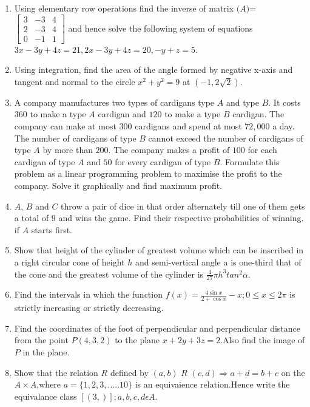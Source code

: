 \documentclass[12pt,-letter paper]{article}
\let\vec\mathbf{}
\let\vec\mathbf{}
\let\vec\mathbf{}
\providecommand{\myvec}[1]{\ensuremath{\begin{bmatrix}#1\end{bmatrix}}}
\providecommand{\brak}[1]{\ensuremath{\left(#1\right)}}
\begin{document}
\begin{enumerate}
\item Using elementary row operations find the inverse of matrix $\vec(A)$=$\myvec{3 & -3 & 4 \\ 2 & -3 & 4 \\ 0 & -1 & 1}$ and hence solve the following system of equations $3x-3y+4z=21,2x-3y+4z=20,-y+z=5$.
\item Using integration, find the area of the angle formed by negative x-axis and tangent and normal to the circle $x^2+y^2=9$ at $\brak{-1,2\sqrt{2}}$.
\item A company manufactures two types of cardigans type $A$ and type $B$. It costs \rupee$360$ to make a type $A$ cardigan and \rupee$120$ to make a type $B$ cardigan. The company can make at most $300$ cardigans and spend at most \rupee$72,000$ a day. The number of cardigans of type $B$ cannot exceed the number of cardigans of type $A$ by more than $200$. The company makes a profit of \rupee$100$ for each cardigan of type $A$ and \rupee$50$ for every cardigan of type $B$.
Formulate this problem as a linear programming problem to maximise the profit to the company. Solve it graphically and find maximum profit.
\item $A$, $B$ and $C$ throw a pair of dice in that order alternately till one of them gets a total of $9$ and wins the game. Find their respective probabilities of winning. if $A$ starts first.
\item Show that height of the cylinder of greatest volume which can be inscribed in a right circular cone of height $h$ and semi-vertical angle a is one-third that of the cone and the greatest volume of the cylinder is $\frac{4}{27}\pi h^3 tan^2{\alpha}$.
\item Find the intervals in which the function $f\brak{x}=\frac{4\sin{x}}{2+\cos{x}}-x; 0\leq x \leq 2\pi$ is strictly increasing or strictly decreasing.
\item Find the coordinates of the foot of perpendicular and perpendicular distance from the point $P\brak{4 , 3 , 2 }$ to the plane $x+2y+3z=2$.Also find the image of $P$ in the plane.
\item Show that the relation $R$ defined by $\brak{a,b}$ $R$ $\brak{c,d} \Rightarrow a+d=b+c$ on the $A\times A$,where $a=\{1,2,3,.....10\}$ is an equivaience relation.Hence write the equivalance class $[\brak{3,}] ;a,b,c,d \epsilon A$.


\end{enumerate}
\end{document}

